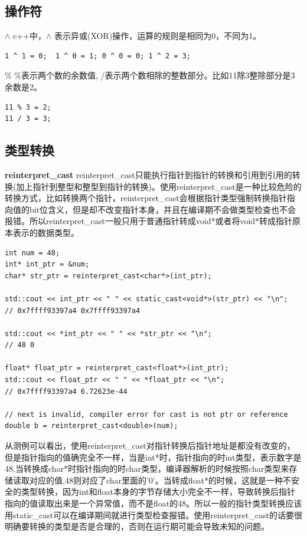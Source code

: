 \documentclass[12pt]{book}
\begin{document}
\subsection{操作符}
$\land$ \newline
c++中，$\land$ 表示异或(XOR)操作，运算的规则是相同为0，不同为1。
\begin{lstlisting}
1 ^ 1 = 0;  1 ^ 0 = 1; 0 ^ 0 = 0; 1 ^ 2 = 3;
\end{lstlisting}

\% \newline
\%表示两个数的余数值, /表示两个数相除的整数部分。比如11除3整除部分是3余数是2。
\begin{lstlisting}
11 % 3 = 2;
11 / 3 = 3;
\end{lstlisting}

\subsection{类型转换}
\textbf{reinterpret\_cast} \newline
reinterpret\_cast只能执行指针到指针的转换和引用到引用的转换(加上指针到整型和整型到指针的转换)。使用reinterpret\_cast是一种比较危险的转换方式，比如转换两个指针，reinterpret\_cast会根据指针类型强制转换指针指向值的bit位含义，但是却不改变指针本身，并且在编译期不会做类型检查也不会报错。所以reinterpret\_cast一般只用于普通指针转成void*或者将void*转成指针原本表示的数据类型。
\begin{lstlisting}
int num = 48;
int* int_ptr = &num;
char* str_ptr = reinterpret_cast<char*>(int_ptr);

std::cout << int_ptr << " " << static_cast<void*>(str_ptr) << "\n";
// 0x7ffff93397a4 0x7ffff93397a4

std::cout << *int_ptr << " " << *str_ptr << "\n";
// 48 0

float* float_ptr = reinterpret_cast<float*>(int_ptr);
std::cout << float_ptr << " " << *float_ptr << "\n";
// 0x7ffff93397a4 6.72623e-44

// next is invalid, compiler error for cast is not ptr or reference
double b = reinterpret_cast<double>(num);  
\end{lstlisting}
从测例可以看出，使用reinterpret\_cast对指针转换后指针地址是都没有改变的，但是指针指向的值确完全不一样，当是int*时，指针指向的时int类型，表示数字是48,当转换成char*时指针指向的时char类型，编译器解析的时候按照char类型来存储读取对应的值,48则对应了char里面的'0'。当转成float*的时候，这就是一种不安全的类型转换，因为int和float本身的字节存储大小完全不一样，导致转换后指针指向的值读取出来是一个异常值，而不是float的48。所以一般的指针类型转换应该用static\_cast可以在编译期间就进行类型检查报错。使用reinterpret\_cast的话要很明确要转换的类型是否是合理的，否则在运行期可能会导致未知的问题。\newline
\end{document}
